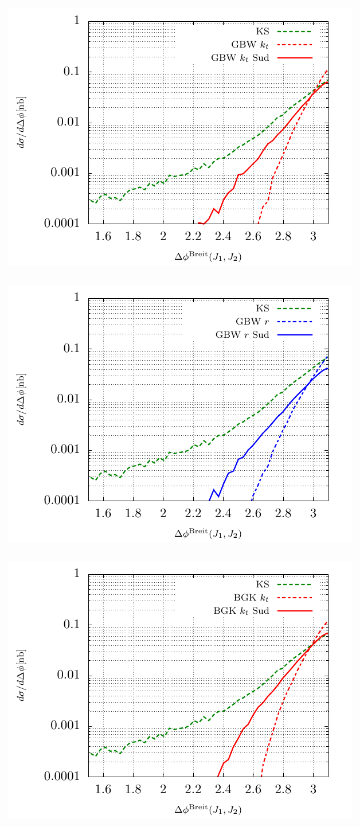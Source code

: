 \documentclass[a4,12pt]{article}
\begin{document}
\begin{figure}[p]
\begin{subfigure}{0.48\textwidth}
		\includegraphics[width=\textwidth]{gnuplot/plotGBW2Jets}
	\end{subfigure}
	\begin{subfigure}{0.48\textwidth}
		\includegraphics[width=\textwidth]{gnuplot/plotGBW3Jets}
	\end{subfigure}
	\begin{subfigure}{0.48\textwidth}
		\includegraphics[width=\textwidth]{gnuplot/plotBGK2Jets}

\end{subfigure}
\end{figure}
\end{document}
